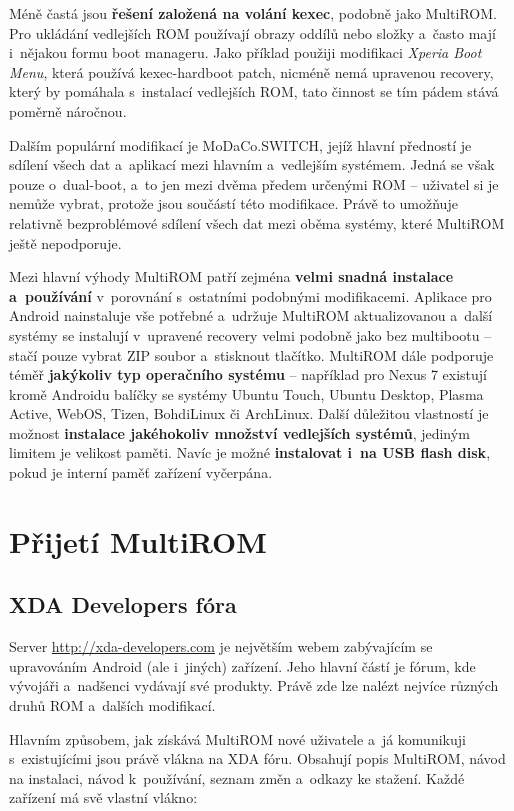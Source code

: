 \documentclass[12pt, a4paper, oneside]{article}
\newcommand{\B}{\textbf} %
\newcommand{\It}{\textit}  %
\begin{document}
Méně častá jsou \B{řešení založená na volání kexec}, podobně jako MultiROM. Pro ukládání vedlejších ROM používají obrazy oddílů nebo složky a~často mají i~nějakou formu boot manageru. Jako příklad použiji modifikaci \It{Xperia Boot Menu}\cite{xperia-boot-menu}, která používá kexec-hardboot patch, nicméně nemá upravenou recovery, který by pomáhala s~instalací vedlejších ROM, tato činnost se tím pádem stává poměrně náročnou.

Dalším populární modifikací je MoDaCo.SWITCH\cite{modaco-switch}, jejíž hlavní předností je sdílení všech dat a~aplikací mezi hlavním a~vedlejším systémem. Jedná se však pouze o~dual-boot, a~to jen mezi dvěma předem určenými ROM -- uživatel si je nemůže vybrat, protože jsou součástí této modifikace. Právě to umožňuje relativně bezproblémové sdílení všech dat mezi oběma systémy, které MultiROM ještě nepodporuje.

Mezi hlavní výhody MultiROM patří zejména \B{velmi snadná instalace a~používání} v~porovnání s~ostatními podobnými modifikacemi. Aplikace pro Android nainstaluje vše potřebné a~udržuje MultiROM aktualizovanou a~další systémy se instalují v~upravené recovery velmi podobně jako bez multibootu -- stačí pouze vybrat ZIP soubor a~stisknout tlačítko. MultiROM dále podporuje téměř \B{jakýkoliv typ operačního systému} -- například pro Nexus 7 existují kromě Androidu balíčky se systémy Ubuntu Touch, Ubuntu Desktop, Plasma Active, WebOS, Tizen, BohdiLinux či ArchLinux. Další důležitou vlastností je možnost \B{instalace jakéhokoliv množství vedlejších systémů}, jediným limitem je velikost paměti. Navíc je možné \B{instalovat i~na USB flash disk}, pokud je interní paměť zařízení vyčerpána.

\section{Přijetí MultiROM}
\subsection{XDA Developers fóra}
Server \url{http://xda-developers.com} je největším webem zabývajícím se upravováním Android (ale i~jiných) zařízení. Jeho hlavní částí je fórum, kde vývojáři a~nadšenci vydávají své produkty. Právě zde lze nalézt nejvíce různých druhů ROM a~dalších modifikací.

Hlavním způsobem, jak získává MultiROM nové uživatele a~já komunikuji s~existujícími jsou právě vlákna na XDA fóru. Obsahují popis MultiROM, návod na instalaci, návod k~používání, seznam změn a~odkazy ke stažení. Každé zařízení má svě vlastní vlákno:
\end{document}
